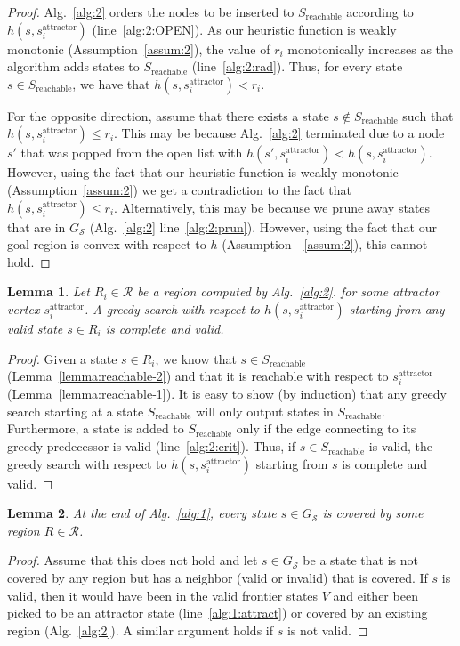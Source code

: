 \documentclass[letterpaper]{article} %
\newcommand{\calS}{\ensuremath{\mathcal{S}}\xspace}
\newcommand{\calR}{\ensuremath{\mathcal{R}}\xspace}
\newcommand{\sAttract}{\ensuremath{s^{\text{attractor}}_i}\xspace}
\newtheorem{lemma}{Lemma}
\begin{document}
\begin{proof}
Alg.~\ref{alg:2} orders the nodes to be inserted to $S_{\text{reachable}}$ according to $h(s, \sAttract)$ (line~\ref{alg:2:OPEN}).
As our heuristic function is weakly monotonic (Assumption~\ref{assum:2}), the value of $r_i$ monotonically increases as the algorithm adds states to $S_{\text{reachable}}$ (line~\ref{alg:2:rad}).
Thus, for every state $s \in S_{\text{reachable}}$, we have that $h(s, \sAttract) < r_i$.

For the opposite direction, assume that there exists a state $s \notin S_{\text{reachable}}$ such that $h(s, \sAttract) \leq r_i$.
This may be because  Alg.~\ref{alg:2} terminated due to a node $s'$ that was popped from the open list with 
$h(s', \sAttract) < h(s, \sAttract)$.
However, using the fact that our heuristic function is weakly monotonic (Assumption~\ref{assum:2}) we get a contradiction to the fact that $h(s, \sAttract) \leq r_i$.
Alternatively, this may be because we prune away states that are in $G_\calS$  (Alg.~\ref{alg:2} line~\ref{alg:2:prun}).
However, using the fact that our goal region is convex with respect to $h$ (Assumption~~\ref{assum:2}), this cannot hold.
\end{proof}

\begin{lemma}
\label{lemma:greedy}
Let $R_i \in \calR$ be a region computed by Alg.~\ref{alg:2}.
for some attractor vertex \sAttract.
% 
A greedy search with respect to $h(s, \sAttract)$  starting from any valid state $s \in R_i$ is complete and valid.
\end{lemma}

\begin{proof}
Given a state $s \in R_i$, we know that $s \in S_{\text{reachable}}$ (Lemma~\ref{lemma:reachable-2})
and that it is reachable with respect to \sAttract (Lemma~\ref{lemma:reachable-1}).
%
It is easy to show (by induction) that any greedy search starting at a state $S_{\text{reachable}}$ will only output states in $S_{\text{reachable}}$.
Furthermore, a state is added to $S_{\text{reachable}}$ only if the edge connecting to its greedy predecessor is valid (line~\ref{alg:2:crit}).
Thus, if $s\in S_{\text{reachable}}$ is valid, the greedy search with respect to $h(s, \sAttract)$  starting from $s$ is complete and valid.
\end{proof}

\begin{lemma}
\label{lemma:coverage}
At the end of Alg.~\ref{alg:1}, every state $s \in G_\calS$ is covered by some region $R \in \calR$.
\end{lemma}
\begin{proof}
Assume that this does not hold and let $s \in G_\calS$ be a state that is not covered by any region but has a neighbor (valid or invalid) that is covered.
%
If $s$ is valid, then it would have been in the valid frontier states $V$ and either been picked to be an attractor state (line~\ref{alg:1:attract}) or covered by an existing region (Alg.~\ref{alg:2}).
%
A similar argument holds if $s$ is not valid.
\end{proof}
\end{document}
